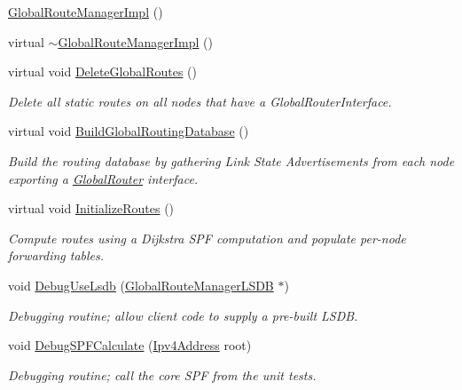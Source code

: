 \begin{DoxyCompactItemize}
\item 
\hyperlink{classns3_1_1GlobalRouteManagerImpl_a1cf679f897a5196e5890f007746d1b7b}{Global\+Route\+Manager\+Impl} ()
\item 
virtual \hyperlink{classns3_1_1GlobalRouteManagerImpl_a187579db3a512ec1a51d669b1359c10b}{$\sim$\+Global\+Route\+Manager\+Impl} ()
\item 
virtual void \hyperlink{classns3_1_1GlobalRouteManagerImpl_a74aa2a4b5dc2015b6424cb307fcc2d1a}{Delete\+Global\+Routes} ()
\begin{DoxyCompactList}\small\item\em Delete all static routes on all nodes that have a Global\+Router\+Interface. \end{DoxyCompactList}\item 
virtual void \hyperlink{classns3_1_1GlobalRouteManagerImpl_a4354ed5c5b4b26f9593991e9254a1370}{Build\+Global\+Routing\+Database} ()
\begin{DoxyCompactList}\small\item\em Build the routing database by gathering Link State Advertisements from each node exporting a \hyperlink{classns3_1_1GlobalRouter}{Global\+Router} interface. \end{DoxyCompactList}\item 
virtual void \hyperlink{classns3_1_1GlobalRouteManagerImpl_a25f57b2c41927c1a3f0bbba596accb6b}{Initialize\+Routes} ()
\begin{DoxyCompactList}\small\item\em Compute routes using a Dijkstra S\+PF computation and populate per-\/node forwarding tables. \end{DoxyCompactList}\item 
void \hyperlink{classns3_1_1GlobalRouteManagerImpl_a9e287c00be9cb2d6d5cbb1a7cbdb40e9}{Debug\+Use\+Lsdb} (\hyperlink{classns3_1_1GlobalRouteManagerLSDB}{Global\+Route\+Manager\+L\+S\+DB} $\ast$)
\begin{DoxyCompactList}\small\item\em Debugging routine; allow client code to supply a pre-\/built L\+S\+DB. \end{DoxyCompactList}\item 
void \hyperlink{classns3_1_1GlobalRouteManagerImpl_aaa692001ef22911e3483583b0de78909}{Debug\+S\+P\+F\+Calculate} (\hyperlink{classns3_1_1Ipv4Address}{Ipv4\+Address} root)
\begin{DoxyCompactList}\small\item\em Debugging routine; call the core S\+PF from the unit tests. \end{DoxyCompactList}\end{DoxyCompactItemize}
